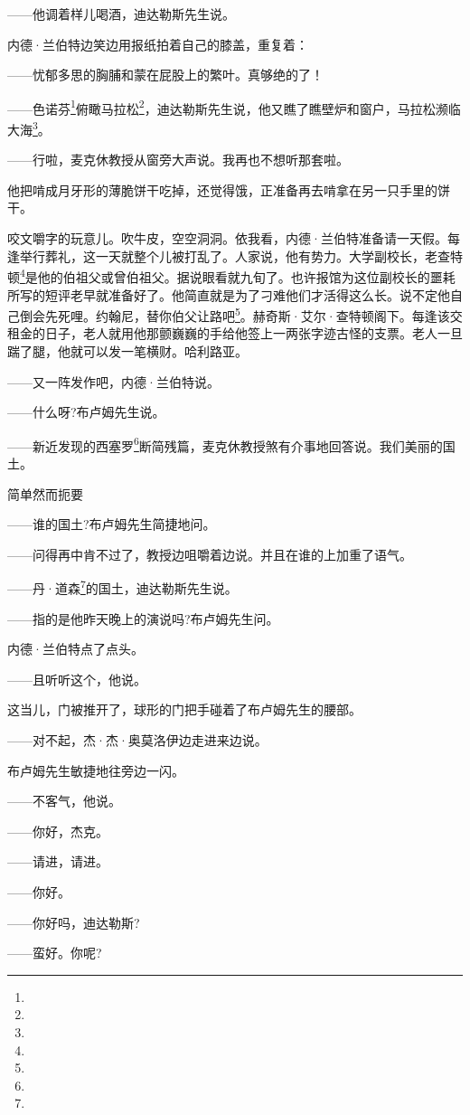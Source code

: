 \par ——他调着样儿喝酒，迪达勒斯先生说。
\par 内德·兰伯特边笑边用报纸拍着自己的膝盖，重复着：
\par ——忧郁多思的胸脯和蒙在屁股上的繁叶。真够绝的了！
\par ——色诺芬\footnote{}俯瞰马拉松\footnote{}，迪达勒斯先生说，他又瞧了瞧壁炉和窗户，马拉松濒临大海\footnote{}。
\par ——行啦，麦克休教授从窗旁大声说。我再也不想听那套啦。
\par 他把啃成月牙形的薄脆饼干吃掉，还觉得饿，正准备再去啃拿在另一只手里的饼干。
\par 咬文嚼字的玩意儿。吹牛皮，空空洞洞。依我看，内德·兰伯特准备请一天假。每逢举行葬礼，这一天就整个儿被打乱了。人家说，他有势力。大学副校长，老查特顿\footnote{}是他的伯祖父或曾伯祖父。据说眼看就九旬了。也许报馆为这位副校长的噩耗所写的短评老早就准备好了。他简直就是为了刁难他们才活得这么长。说不定他自己倒会先死哩。约翰尼，替你伯父让路吧\footnote{}。赫奇斯·艾尔·查特顿阁下。每逢该交租金的日子，老人就用他那颤巍巍的手给他签上一两张字迹古怪的支票。老人一旦踹了腿，他就可以发一笔横财。哈利路亚。
\par ——又一阵发作吧，内德·兰伯特说。
\par ——什么呀?布卢姆先生说。
\par ——新近发现的西塞罗\footnote{}断简残篇，麦克休教授煞有介事地回答说。我们美丽的国土。
\par 简单然而扼要
\par ——谁的国土?布卢姆先生简捷地问。
\par ——问得再中肯不过了，教授边咀嚼着边说。并且在谁的上加重了语气。
\par ——丹·道森\footnote{}的国土，迪达勒斯先生说。
\par ——指的是他昨天晚上的演说吗?布卢姆先生问。
\par 内德·兰伯特点了点头。
\par ——且听听这个，他说。
\par 这当儿，门被推开了，球形的门把手碰着了布卢姆先生的腰部。
\par ——对不起，杰·杰·奥莫洛伊边走进来边说。
\par 布卢姆先生敏捷地往旁边一闪。
\par ——不客气，他说。
\par ——你好，杰克。
\par ——请进，请进。
\par ——你好。
\par ——你好吗，迪达勒斯?
\par ——蛮好。你呢?
